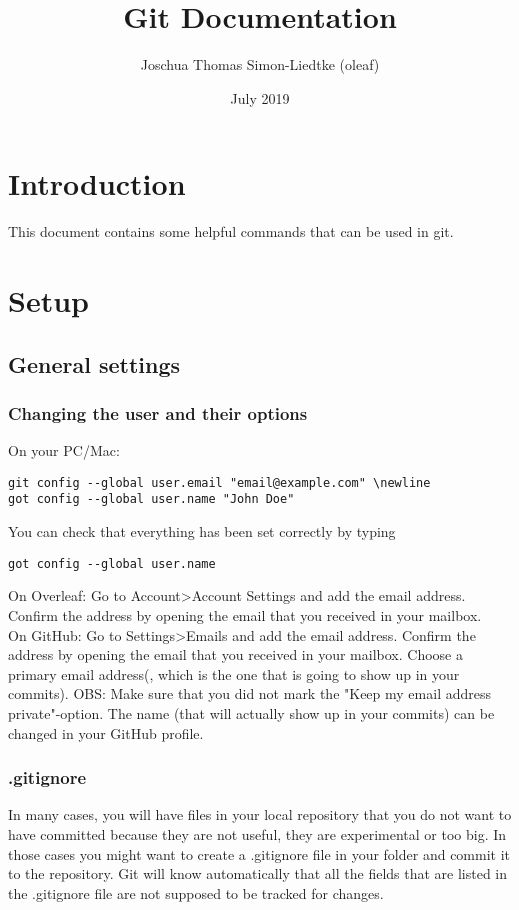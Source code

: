 \documentclass{article}
\title{Git Documentation}
\author{Joschua Thomas Simon-Liedtke (oleaf)}
\date{July 2019}
\begin{document}
\maketitle

\tableofcontents

\section{Introduction}
This document contains some helpful commands that can be used in git.

\section{Setup}

\subsection{General settings}

\subsubsection{Changing the user and their options}

On your PC/Mac:
\begin{verbatim}
git config --global user.email "email@example.com" \newline
got config --global user.name "John Doe"
\end{verbatim}
You can check that everything has been set correctly by typing
\begin{verbatim}
got config --global user.name
\end{verbatim}

On Overleaf:
Go to Account\textgreater  Account Settings and add the email address. Confirm the address by opening the email that you received in your mailbox.
\\

On GitHub:
Go to Settings\textgreater  Emails and add the email address. Confirm the address by opening the email that you received in your mailbox. Choose a primary email address(, which is the one that is going to show up in your commits). OBS: Make sure that you did not mark the "Keep my email address private"-option. The name (that will actually show up in your commits) can be changed in your GitHub profile.

\subsubsection{.gitignore}
In many cases, you will have files in your local repository that you do not want to have committed because they are not useful, they are experimental or too big. In those cases you might want to create a .gitignore file in your folder and commit it to the repository. Git will know automatically that all the fields that are listed in the .gitignore file are not supposed to be tracked for changes.
\end{document}

